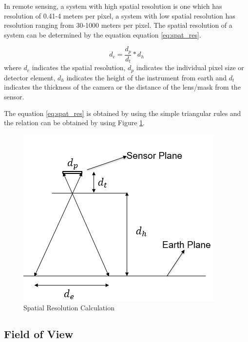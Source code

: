 In remote sensing, a system with high spatial resolution is one which has resolution of 0.41-4 meters per pixel, a system with low spatial resolution has resolution ranging from 30-1000 meters per pixel\cite{SpatialResol}. The spatial resolution of a system can be determined by the equation equation \ref{eq:spat_res}. 

\begin{equation}
\label{eq:spat_res}
d_e = \frac{d_p}{d_t} * d_h
\end{equation}
where $d_e$ indicates the spatial resolution, $d_p$ indicates the individual pixel size or detector element, $d_h$ indicates the height of the instrument from earth and $d_t$ indicates the thickness of the camera or the distance of the lens/mask from the sensor.

The equation \ref{eq:spat_res} is obtained by using the simple triangular rules and the relation can be obtained by using Figure \ref{fig:spatial_resolution_calc}.
\begin{figure}[htb]
\includegraphics[width=\textwidth]{pics/spatialRes}
\caption{Spatial Resolution Calculation}
\label{fig:spatial_resolution_calc}
\end{figure}

\subsection{Field of View}

